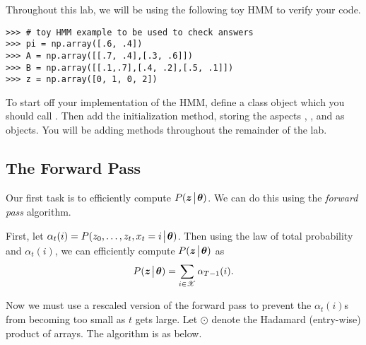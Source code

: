 
Throughout this lab, we will be using the following toy HMM to verify your code.
\begin{lstlisting}
>>> # toy HMM example to be used to check answers
>>> pi = np.array([.6, .4])
>>> A = np.array([[.7, .4],[.3, .6]])
>>> B = np.array([[.1,.7],[.4, .2],[.5, .1]])
>>> z = np.array([0, 1, 0, 2])
\end{lstlisting}

\begin{problem}
To start off your implementation of the HMM, define a class object which you should call .
Then add the initialization method, storing the  aspects , , and  as  objects.
You will be adding methods throughout the remainder of the lab.
\end{problem}

\subsection*{The Forward Pass}
Our first task is to efficiently compute $P(\boldsymbol z \!\mathrel{\big|}\! \boldsymbol\theta)$.
We can do this using the \emph{forward pass} algorithm.

First, let $\alpha_t(i)=P(z_0, \ldots, z_t, x_t=i \!\mathrel{\big|}\! \boldsymbol\theta)$. Then using the law of total probability and $\alpha_t(i)$, we can efficiently compute $P(\boldsymbol z \!\mathrel{\big|}\! \boldsymbol\theta)$ as 
\[
P(\boldsymbol z \!\mathrel{\big|}\! \boldsymbol\theta) = \sum_{i \in \mathscr{X}} \alpha_{T-1}(i).
\]

Now we must use a rescaled version of the forward pass to prevent the $\alpha_t(i)$s from becoming too small as $t$ gets large. Let $\odot$ denote the Hadamard (entry-wise) product of arrays.
The algorithm is as below.

